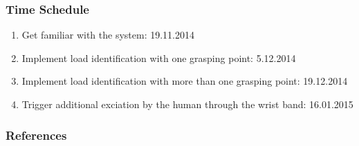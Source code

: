 \documentclass[student,noshadow]{ITRslides}
\begin{document}
\begin{frame}
	\frametitle{Time Schedule}
	\begin{enumerate}
		\item Get familiar with the system: 19.11.2014
		\item Implement load identification with one grasping point: 5.12.2014
		\item Implement load identification with more than one grasping point:  19.12.2014
		\item Trigger additional exciation by the human through the wrist band: 16.01.2015
	\end{enumerate}
\end{frame}

\appendix
\begin{frame}
	\frametitle{References}
	\printbibliography
\end{frame}
\end{document}
